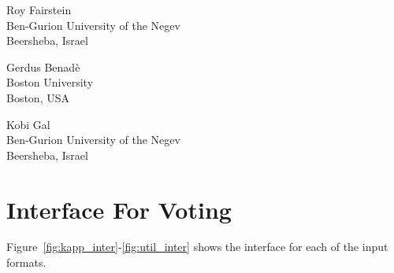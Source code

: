 \documentclass{comsoc2023}
\begin{document}

\begin{contact}
Roy Fairstein\\
Ben-Gurion University of the Negev\\
Beersheba, Israel\\
\end{contact}

\begin{contact}
Gerdus Benad\`e\\
Boston University \\
Boston, USA\\
\end{contact}

\begin{contact}
Kobi Gal\\
Ben-Gurion University of the Negev\\
Beersheba, Israel\\
\end{contact}


\clearpage
\appendix


\section{Interface For Voting}\label{app:interfaces}
Figure~\ref{fig:kapp_inter}-\ref{fig:util_inter} shows   the interface for each of the input formats.
\end{document}

